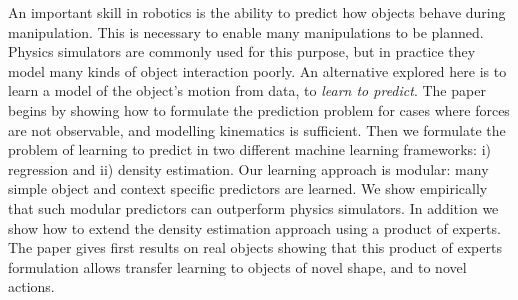 An important skill in robotics is the ability to predict how objects behave during manipulation.  This is necessary to enable
many manipulations to be planned.  Physics simulators are commonly
used for this purpose, but in practice they model many kinds of object
interaction poorly.  An alternative explored here is to
learn a model of the object's motion from data, to {\em learn to predict}. The paper begins by showing how to formulate the prediction problem for cases where forces are not observable, and modelling kinematics is sufficient. Then we formulate the problem of learning to predict in two different machine learning frameworks: i) regression and ii) density estimation. Our learning approach is modular: many simple object and context specific predictors are learned. We show empirically that such modular predictors can outperform physics simulators.  In addition we show how to extend the density estimation approach using a product of experts. The paper gives first results on real objects showing that this product of experts formulation allows transfer learning to objects of novel shape, and to novel actions.